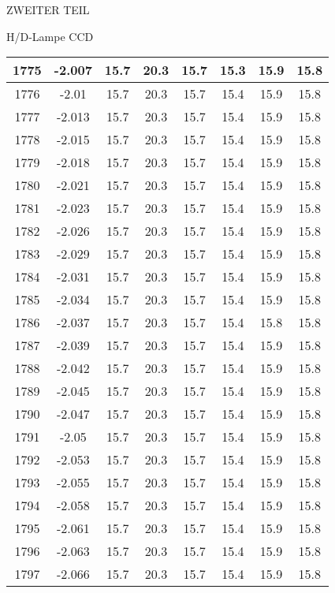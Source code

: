 \begin{appendix}
\begin{chapter}{ZWEITER TEIL}
\begin{section}{H/D-Lampe CCD}
\begin{scriptsize}
\begin{longtable}[htbp]{|c|c|c|c|c|c|c|c|}
            1775 & -2.007 & 15.7 & 20.3 & 15.7 & 15.3 & 15.9 & 15.8 \\ \hline
            1776 & -2.01 & 15.7 & 20.3 & 15.7 & 15.4 & 15.9 & 15.8 \\ \hline
            1777 & -2.013 & 15.7 & 20.3 & 15.7 & 15.4 & 15.9 & 15.8 \\ \hline
            1778 & -2.015 & 15.7 & 20.3 & 15.7 & 15.4 & 15.9 & 15.8 \\ \hline
            1779 & -2.018 & 15.7 & 20.3 & 15.7 & 15.4 & 15.9 & 15.8 \\ \hline
            1780 & -2.021 & 15.7 & 20.3 & 15.7 & 15.4 & 15.9 & 15.8 \\ \hline
            1781 & -2.023 & 15.7 & 20.3 & 15.7 & 15.4 & 15.9 & 15.8 \\ \hline
            1782 & -2.026 & 15.7 & 20.3 & 15.7 & 15.4 & 15.9 & 15.8 \\ \hline
            1783 & -2.029 & 15.7 & 20.3 & 15.7 & 15.4 & 15.9 & 15.8 \\ \hline
            1784 & -2.031 & 15.7 & 20.3 & 15.7 & 15.4 & 15.9 & 15.8 \\ \hline
            1785 & -2.034 & 15.7 & 20.3 & 15.7 & 15.4 & 15.9 & 15.8 \\ \hline
            1786 & -2.037 & 15.7 & 20.3 & 15.7 & 15.4 & 15.8 & 15.8 \\ \hline
            1787 & -2.039 & 15.7 & 20.3 & 15.7 & 15.4 & 15.9 & 15.8 \\ \hline
            1788 & -2.042 & 15.7 & 20.3 & 15.7 & 15.4 & 15.9 & 15.8 \\ \hline
            1789 & -2.045 & 15.7 & 20.3 & 15.7 & 15.4 & 15.9 & 15.8 \\ \hline
            1790 & -2.047 & 15.7 & 20.3 & 15.7 & 15.4 & 15.9 & 15.8 \\ \hline
            1791 & -2.05 & 15.7 & 20.3 & 15.7 & 15.4 & 15.9 & 15.8 \\ \hline
            1792 & -2.053 & 15.7 & 20.3 & 15.7 & 15.4 & 15.9 & 15.8 \\ \hline
            1793 & -2.055 & 15.7 & 20.3 & 15.7 & 15.4 & 15.9 & 15.8 \\ \hline
            1794 & -2.058 & 15.7 & 20.3 & 15.7 & 15.4 & 15.9 & 15.8 \\ \hline
            1795 & -2.061 & 15.7 & 20.3 & 15.7 & 15.4 & 15.9 & 15.8 \\ \hline
            1796 & -2.063 & 15.7 & 20.3 & 15.7 & 15.4 & 15.9 & 15.8 \\ \hline
            1797 & -2.066 & 15.7 & 20.3 & 15.7 & 15.4 & 15.9 & 15.8 \\ \hline

\end{longtable}
\end{scriptsize}
\end{section}
\end{chapter}
\end{appendix}
